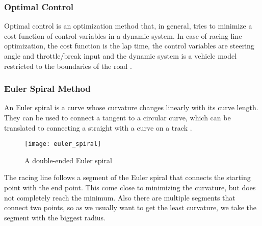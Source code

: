 \subsubsection{Optimal Control}
Optimal control is an optimization method that, in general, tries to minimize a cost function of control variables in a dynamic system. In case of racing line optimization, the cost function is the lap time, the control variables are steering angle and throttle/break input and the dynamic system is a vehicle model restricted to the boundaries of the road \cite{gustafsson08}.

\subsubsection{Euler Spiral Method}
An Euler spiral is a curve whose curvature changes linearly with its curve length. They can be used to connect a tangent to a circular curve, which can be translated to connecting a straight with a curve on a track \cite{xiong09}.

\begin{figure}[!ht]
	\centering
	\texttt{[image: euler\_spiral]}
	\caption{A double-ended Euler spiral}
	\label{fig:euler_spiral}
\end{figure}

The racing line follows a segment of the Euler spiral that connects the starting point with the end point. This come close to minimizing the curvature, but does not completely reach the minimum. Also there are multiple segments that connect two points, so as we usually want to get the least curvature, we take the segment with the biggest radius.

\clearpage